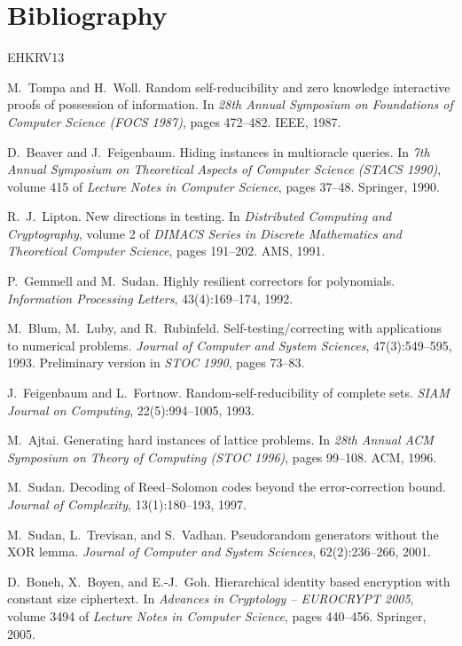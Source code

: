 \documentclass{conjura-solution}
\begin{document}
\section{Bibliography}

\begin{conjurabibliography}{EHKRV13}

M.~Tompa and H.~Woll.
Random self-reducibility and zero knowledge interactive proofs of possession of
information.
In \emph{28th Annual Symposium on Foundations of Computer Science (FOCS 1987)},
pages 472--482. IEEE, 1987.

D.~Beaver and J.~Feigenbaum.
Hiding instances in multioracle queries.
In \emph{7th Annual Symposium on Theoretical Aspects of Computer Science (STACS 1990)},
volume 415 of \emph{Lecture Notes in Computer Science}, pages 37--48. Springer, 1990.

R.~J.~Lipton.
New directions in testing.
In \emph{Distributed Computing and Cryptography}, volume 2 of \emph{DIMACS Series in
Discrete Mathematics and Theoretical Computer Science}, pages 191--202. AMS, 1991.

P.~Gemmell and M.~Sudan.
Highly resilient correctors for polynomials.
\emph{Information Processing Letters}, 43(4):169--174, 1992.

M.~Blum, M.~Luby, and R.~Rubinfeld.
Self-testing/correcting with applications to numerical problems.
\emph{Journal of Computer and System Sciences}, 47(3):549--595, 1993.
Preliminary version in \emph{STOC 1990}, pages 73--83.

J.~Feigenbaum and L.~Fortnow.
Random-self-reducibility of complete sets.
\emph{SIAM Journal on Computing}, 22(5):994--1005, 1993.

M.~Ajtai.
Generating hard instances of lattice problems.
In \emph{28th Annual ACM Symposium on Theory of Computing (STOC 1996)}, pages 99--108.
ACM, 1996.

M.~Sudan.
Decoding of Reed--Solomon codes beyond the error-correction bound.
\emph{Journal of Complexity}, 13(1):180--193, 1997.

M.~Sudan, L.~Trevisan, and S.~Vadhan.
Pseudorandom generators without the XOR lemma.
\emph{Journal of Computer and System Sciences}, 62(2):236--266, 2001.

D.~Boneh, X.~Boyen, and E.-J.~Goh.
Hierarchical identity based encryption with constant size ciphertext.
In \emph{Advances in Cryptology -- EUROCRYPT 2005},
volume 3494 of \emph{Lecture Notes in Computer Science}, pages 440--456. Springer, 2005.


\end{conjurabibliography}
\end{document}
